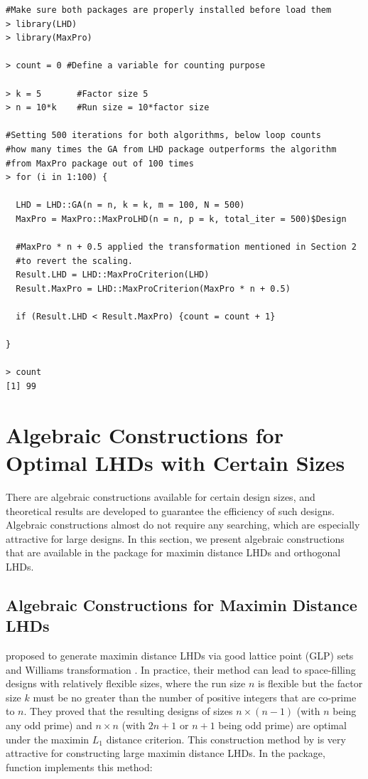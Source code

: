 {\small
	\begin{verbatim}
#Make sure both packages are properly installed before load them
> library(LHD)
> library(MaxPro)

> count = 0 #Define a variable for counting purpose

> k = 5       #Factor size 5
> n = 10*k    #Run size = 10*factor size

#Setting 500 iterations for both algorithms, below loop counts
#how many times the GA from LHD package outperforms the algorithm
#from MaxPro package out of 100 times
> for (i in 1:100) {

  LHD = LHD::GA(n = n, k = k, m = 100, N = 500)
  MaxPro = MaxPro::MaxProLHD(n = n, p = k, total_iter = 500)$Design

  #MaxPro * n + 0.5 applied the transformation mentioned in Section 2
  #to revert the scaling.
  Result.LHD = LHD::MaxProCriterion(LHD)
  Result.MaxPro = LHD::MaxProCriterion(MaxPro * n + 0.5)

  if (Result.LHD < Result.MaxPro) {count = count + 1}

}

> count
[1] 99
	\end{verbatim}
}

\section{Algebraic Constructions for Optimal LHDs with Certain Sizes}\label{Constr}

There are algebraic constructions available for certain design sizes, and theoretical results are developed to guarantee the efficiency of such designs. Algebraic constructions almost do not require any searching, which are especially attractive for large designs. In this section, we present algebraic constructions that are available in the  package for maximin distance LHDs and orthogonal LHDs.

\subsection{Algebraic Constructions for Maximin Distance LHDs}\label{WT}

\cite{wang2018optimal} proposed to generate maximin distance LHDs via good lattice point (GLP) sets \citep{zhou2015space} and Williams transformation \citep{williams1949experimental}. In practice, their method can lead to space-filling designs with relatively flexible sizes, where the run size $n$ is flexible but the factor size $k$ must be no greater than the number of positive integers that are co-prime to $n$. They proved that the resulting designs of sizes $n \times (n-1)$  (with $n$ being any odd prime) and $n \times n$ (with $2n+1$ or $n+1$ being odd prime) are optimal under the maximin $L_1$ distance criterion. This construction method by \cite{wang2018optimal} is very attractive for constructing large maximin distance LHDs. In the  package, function  implements this method:

